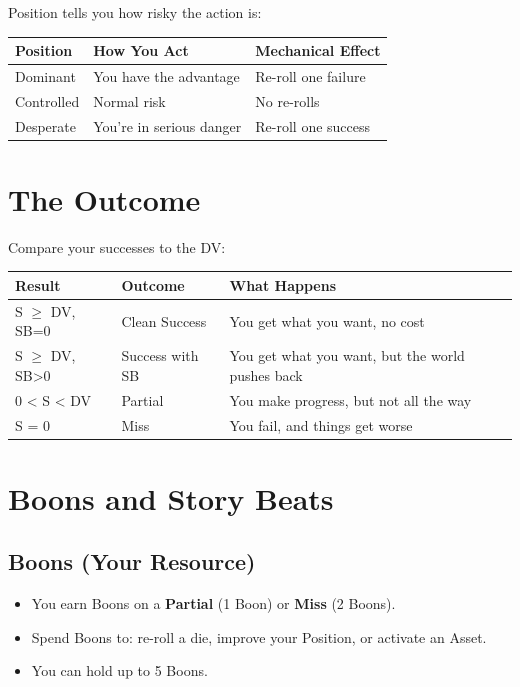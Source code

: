 Position tells you how risky the action is:

\begin{center}
\begin{tabular}{lll}
\toprule
\textbf{Position} & \textbf{How You Act} & \textbf{Mechanical Effect} \\
\midrule
Dominant & You have the advantage & Re-roll one failure \\
Controlled & Normal risk & No re-rolls \\
Desperate & You're in serious danger & Re-roll one success \\
\bottomrule
\end{tabular}
\end{center}

\section{The Outcome}

Compare your successes to the DV:

\begin{center}
\begin{tabular}{lll}
\toprule
\textbf{Result} & \textbf{Outcome} & \textbf{What Happens} \\
\midrule
S $\ge$ DV, SB=0 & Clean Success & You get what you want, no cost \\
S $\ge$ DV, SB>0 & Success with SB & You get what you want, but the world pushes back \\
0 < S < DV & Partial & You make progress, but not all the way \\
S = 0 & Miss & You fail, and things get worse \\
\bottomrule
\end{tabular}
\end{center}

\section{Boons and Story Beats}

\subsection*{Boons (Your Resource)}
\begin{itemize}
  \item You earn Boons on a \textbf{Partial} (1 Boon) or \textbf{Miss} (2 Boons).
  \item Spend Boons to: re-roll a die, improve your Position, or activate an Asset.
  \item You can hold up to 5 Boons.
\end{itemize}

